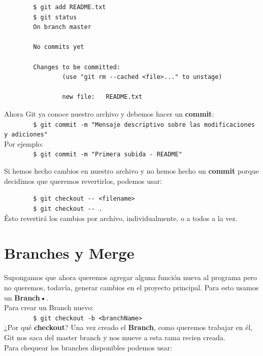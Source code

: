\documentclass[a4paper, 12pt]{article}
\begin{document}
\begin{verbatim}
        $ git add README.txt 
        $ git status
        On branch master  

        No commits yet

        Changes to be committed:
                (use "git rm --cached <file>..." to unstage)

                new file:   README.txt
\end{verbatim}

Ahora Git ya conoce nuestro archivo y debemos hacer un \textbf{commit}:\\

\verb+        $ git commit -m "Mensaje descriptivo sobre las modificaciones y adiciones"+\\

Por ejemplo:\\

\verb+        $ git commit -m "Primera subida - README"+

Si hemos hecho cambios en nuestro archivo y no hemos hecho un \textbf{commit} porque decidimos que queremos revertirlos, podemos usar:

\verb+        $ git checkout -- <filename>+\\
\verb+        $ git checkout -- .+\\

Ésto revertirá los cambios por archivo, individualmente, o a todos a la vez.

\section{Branches y Merge}

Supongamos que ahora queremos agregar alguna función nueva al programa pero no queremos, todavía, generar cambios en el proyecto principal. Para esto usamos un \textbf{Branch•}.\\

Para crear un Branch nuevo:\\

\verb+        $ git checkout -b <branchName>+\\

¿Por qué \textbf{checkout}?
Una vez creado el \textbf{Branch}, como queremos trabajar en él, Git nos saca del master branch y nos mueve a esta rama recien creada.\\
Para chequear los branches disponibles podemos usar:\\
\end{document}
